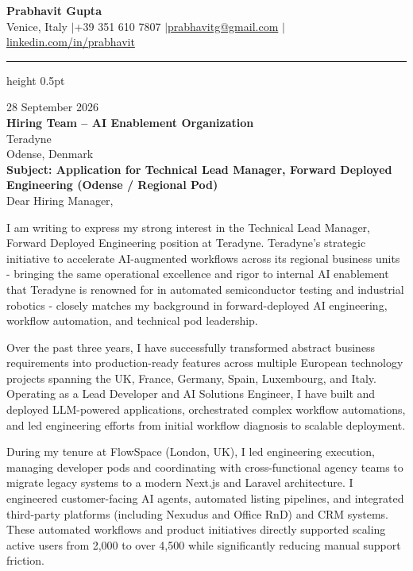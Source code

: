 \documentclass[10pt, a4paper]{article}
\begin{document}

\begin{center}
  {\LARGE\textbf{Prabhavit Gupta}}\\[3pt]
  Venice, Italy \quad$|$\quad +39 351 610 7807 \quad$|$\quad \href{mailto:prabhavitg@gmail.com}{prabhavitg@gmail.com} \quad$|$\quad \href{https://www.linkedin.com/in/prabhavit/}{linkedin.com/in/prabhavit}
\end{center}
\vspace{4pt}
\hrule height 0.5pt
\vspace{10pt}

28 September 2026\\[10pt]
\textbf{Hiring Team -- AI Enablement Organization}\\
Teradyne\\
Odense, Denmark\\[10pt]
\textbf{Subject: Application for Technical Lead Manager, Forward Deployed Engineering (Odense / Regional Pod)}\\[8pt]

Dear Hiring Manager,

I am writing to express my strong interest in the Technical Lead Manager, Forward Deployed Engineering position at Teradyne. Teradyne's strategic initiative to accelerate AI-augmented workflows across its regional business units - bringing the same operational excellence and rigor to internal AI enablement that Teradyne is renowned for in automated semiconductor testing and industrial robotics - closely matches my background in forward-deployed AI engineering, workflow automation, and technical pod leadership.

Over the past three years, I have successfully transformed abstract business requirements into production-ready features across multiple European technology projects spanning the UK, France, Germany, Spain, Luxembourg, and Italy. Operating as a Lead Developer and AI Solutions Engineer, I have built and deployed LLM-powered applications, orchestrated complex workflow automations, and led engineering efforts from initial workflow diagnosis to scalable deployment.

During my tenure at FlowSpace (London, UK), I led engineering execution, managing developer pods and coordinating with cross-functional agency teams to migrate legacy systems to a modern Next.js and Laravel architecture. I engineered customer-facing AI agents, automated listing pipelines, and integrated third-party platforms (including Nexudus and Office RnD) and CRM systems. These automated workflows and product initiatives directly supported scaling active users from 2,000 to over 4,500 while significantly reducing manual support friction.
\end{document}

